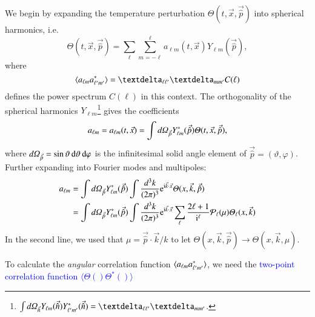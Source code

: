 We begin by expanding the temperature perturbation $\Theta(t, \vec{x}, \vec{\hat{p}})$ into spherical harmonics, i.e.
\begin{equation}
    \Theta(t, \vec{x}, \vec{\hat{p}}) = \sum_{\ell} \sum_{m=-\ell}^{\ell} a_{\ell m}(t, \vec{x}) Y_{\ell m} (\vec{\hat{p}}),
\end{equation}
where
\begin{equation}
    \avg{a\ellm a\ellmp^*} = \deltasym{\ell \ell'} \deltasym{m m'} C(\ell)
\end{equation}
defines the power spectrum $C(\ell)$ in this context. The orthogonality of the spherical harmonics $Y_{\ell m}$\footnote{$\int \dOmg[n] Y\ellm(\vec{\hat{n}}) Y\ellmp^*(\vec{\hat{n}}) = \deltasym{\ell \ell'} \deltasym{m m'} $.} gives the coefficients
\begin{equation}
    a\ellm = a\ellm(t,\vec{x}) = \int \dOmg[p] Y^*_{\ell m} (\vec{\hat{p}}) \Theta(t, \vec{x}, \vec{\hat{p}}),
\end{equation}
where $d\varOmega_{\vec{\hat{p}}} = \sin{\vartheta} \diff \vartheta\diff \varphi$ is the infinitesimal solid angle element of $\vec{\hat{p}} = (\vartheta, \varphi)$. Further expanding into Fourier modes and multipoles:
\begin{equation}
\begin{split}
    a_{\ell m} &= \int \dOmg[p] Y^*_{\ell m} (\vec{\hat{p}}) \int \frac{d^3 k}{(2\pi)^3} \eu[\im \vec{k}\cdot \vec{x}] \Theta(x, \vec{k}, \vec{\hat{p}})  \\
    &= \int \dOmg[p] Y^*_{\ell m} (\vec{\hat{p}}) \int \frac{d^3 k}{(2\pi)^3} \eu[\im \vec{k}\cdot \vec{x}]\sum_{\ell} \frac{2\ell + 1}{\im^\ell} \mathcal{P}_\ell(\mu) \Theta_\ell(x, \vec{k})
\end{split}
\end{equation}
In the second line, we used that $\mu=\vec{\hat{p}}\cdot\vec{k}/k$ to let $\Theta(x,\vec{k}, \vec{\hat{p}}) \to\Theta(x,\vec{k},\mu) $.


To calculate the \textit{angular} correlation function $\langle a\ellm a^*\ellmp \rangle$, we need the \textcolor{blue}{two-point correlation function $\langle \Theta() \Theta^*()\rangle$} 



